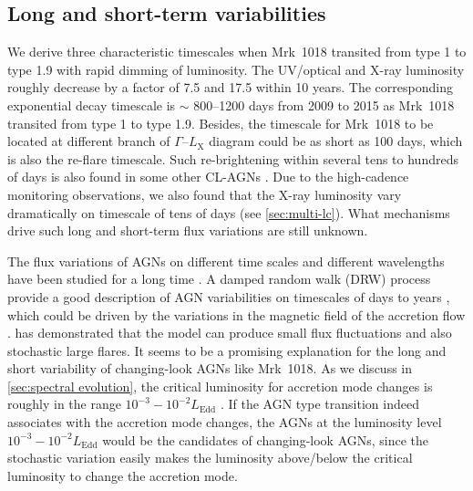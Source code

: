 \documentclass[twocolumn]{aastex63}
\begin{document}


 




\subsection{Long and short-term variabilities}

We derive three characteristic timescales when Mrk~1018 transited from type 1 to type 1.9 with rapid dimming of luminosity. The UV/optical and X-ray luminosity roughly decrease by a factor of 7.5 and 17.5 within 10 years. The corresponding exponential decay timescale is $\sim$ 800--1200 days from 2009 to 2015 as Mrk~1018 transited from type 1 to type 1.9. Besides, the timescale for Mrk~1018 to be located at different branch of $\Gamma$--$L_\mathrm{X}$ diagram could be as short as 100 days, which is also the re-flare timescale. Such re-brightening within several tens to hundreds of days is also found in some other CL-AGNs \citep[e.g.][and references therein]{2017MNRAS.467.1496O,2019MNRAS.487.4057K,2020MNRAS.498..718O}. Due to the high-cadence monitoring observations, we also found that the X-ray luminosity vary dramatically on timescale of tens of days (see \autoref{sec:multi-lc}). What mechanisms drive such long and short-term flux variations are still unknown. 

The flux variations of AGNs on different time scales and different wavelengths have been studied for a long time \citep[see reviews in ][]{1997ARA&A..35..445U}. A damped random walk (DRW) process provide a good description of AGN variabilities on timescales of days to years \citep[e.g.][]{2010ApJ...721.1014M,2011ApJ...730...52K}, which could be driven by the variations in the magnetic field of the accretion flow \citep{2004MNRAS.348..111K,2006MNRAS.368..379M,2007A&A...466..793J}. \citet{2004MNRAS.348..111K} has demonstrated that the model can produce small flux fluctuations and also stochastic large flares. It seems to be a promising explanation for the long and short variability of changing-look AGNs like Mrk~1018. As we discuss in \autoref{sec:spectral evolution}, the critical luminosity for accretion mode changes is roughly in the range $10^{-3}-10^{-2}L_\mathrm{Edd}$ \citep[see also ][]{2019arXiv191203972L}. If the AGN type transition indeed associates with the accretion mode changes, the AGNs at the luminosity level $10^{-3}-10^{-2}L_\mathrm{Edd}$ would be the candidates of changing-look AGNs, since the stochastic variation easily makes the luminosity above/below the critical luminosity to change the accretion mode. 
\end{document}
